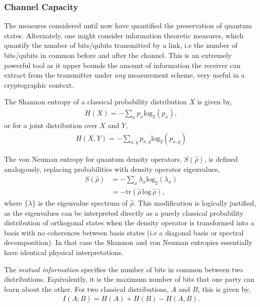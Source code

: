 \documentclass[aps,rmp,twocolumn,amsmath,amssymb,nofootinbib,superscriptaddress]{revtex4}
\begin{document}
%
%

\subsubsection{Channel Capacity}

The measures considered until now have quantified the preservation of quantum states. Alternately, one might consider information theoretic measures, which quantify the number of bits/qubits transmitted by a link, i.e the number of bits/qubits in common before and after the channel. This is an extremely powerful tool as it upper bounds the amount of information the receiver can extract from the transmitter under \emph{any} measurement scheme, very useful in a cryptographic context.

The Shannon entropy \cite{???} of a classical probability distribution $X$ is given by,
\begin{align}
H(X) = -\sum_x p_x\mathrm{log}_2(p_x),
\end{align}
or for a joint distribution over $X$ and $Y$,
\begin{align}
H(X,Y) =  -\sum_{x,y} p_{x,y}\mathrm{log}_2(p_{x,y})
\end{align}

The von Neuman entropy \cite{???} for quantum density operators, $S(\hat\rho)$, is defined analogously, replacing probabilities with density operator eigenvalues,
\begin{align}
S(\hat\rho) &= - \sum_x \lambda_x \mathrm{log}_2 (\lambda_x) \nonumber \\
&= -\mathrm{tr}(\hat\rho\,\mathrm{log}\,\hat\rho),
\end{align}
where $\{\lambda\}$ is the eigenvalue spectrum of $\hat\rho$. This modification is logically justified, as the eigenvalues can be interpreted directly as a purely classical probability distribution of orthogonal states when the density operator is transformed into a basis with no coherences between basis states (i.e a diagonal basis or spectral decomposition). In that case the Shannon and von Neuman entropies essentially have identical physical interpretations.

The \emph{mutual information} specifies the number of bits in common between two distributions. Equivalently, it is the maximum number of bits that one party can learn about the other. For two classical distributions, $A$ and $B$, this is given by,
\begin{align}
I(A;B) = H(A) + H(B) - H(A,B).
\end{align}
\end{document}
